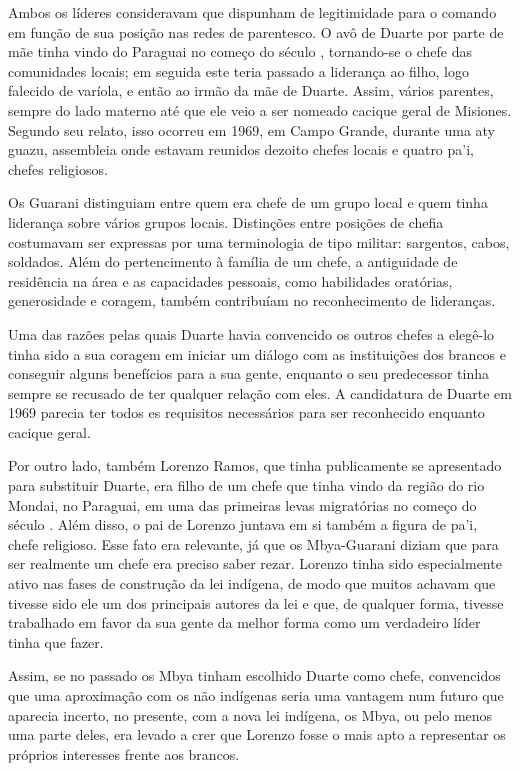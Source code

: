 Ambos os líderes consideravam que dispunham de legitimidade para o
comando em função de sua posição nas redes de parentesco. O avô de
Duarte por parte de mãe tinha vindo do Paraguai no começo do século ,
tornando-se o chefe das comunidades locais; em seguida este teria
passado a liderança ao filho, logo falecido de varíola, e então ao
irmão da mãe de Duarte. Assim, vários parentes, sempre do lado materno
até que ele veio a ser nomeado cacique geral de Misiones. Segundo seu
relato, isso ocorreu em 1969, em Campo Grande, durante uma aty guazu,
assembleia onde estavam reunidos dezoito chefes locais e quatro pa’i,
chefes religiosos. 

Os Guarani distinguiam entre quem era chefe de um grupo local e quem
tinha liderança sobre vários grupos locais. Distinções entre posições
de chefia costumavam ser expressas por uma terminologia de tipo
militar: sargentos, cabos, soldados. Além do pertencimento à família de
um chefe, a antiguidade de residência na área e as capacidades
pessoais, como habilidades oratórias, generosidade e coragem, também
contribuíam no reconhecimento de lideranças. 

Uma das razões pelas quais Duarte havia convencido os outros chefes a
elegê-lo tinha sido a sua coragem em iniciar um diálogo com as
instituições dos brancos e conseguir alguns benefícios para a sua
gente, enquanto o seu predecessor tinha sempre se recusado de ter
qualquer relação com eles. A candidatura de Duarte em 1969 parecia ter
todos es requisitos necessários para ser reconhecido enquanto cacique
geral.

Por outro lado, também Lorenzo Ramos, que tinha publicamente se
apresentado para substituir Duarte, era filho de um chefe que tinha
vindo da região do rio Mondai, no Paraguai, em uma das primeiras levas
migratórias no começo do século . Além disso, o pai de Lorenzo
juntava em si também a figura de pa’i, chefe religioso. Esse fato era
relevante, já que os Mbya-Guarani diziam que para ser realmente um
chefe era preciso saber rezar. Lorenzo tinha sido especialmente ativo
nas fases de construção da lei indígena, de modo que muitos achavam que
tivesse sido ele um dos principais autores da lei e que, de qualquer
forma, tivesse trabalhado em favor da sua gente da melhor forma como um
verdadeiro líder tinha que fazer.

Assim, se no passado os Mbya tinham escolhido Duarte como chefe,
convencidos que uma aproximação com os não indígenas seria uma vantagem
num futuro que aparecia incerto, no presente, com a nova lei indígena,
os Mbya, ou pelo menos uma parte deles, era levado a crer que Lorenzo
fosse o mais apto a representar os próprios interesses frente aos
brancos.

